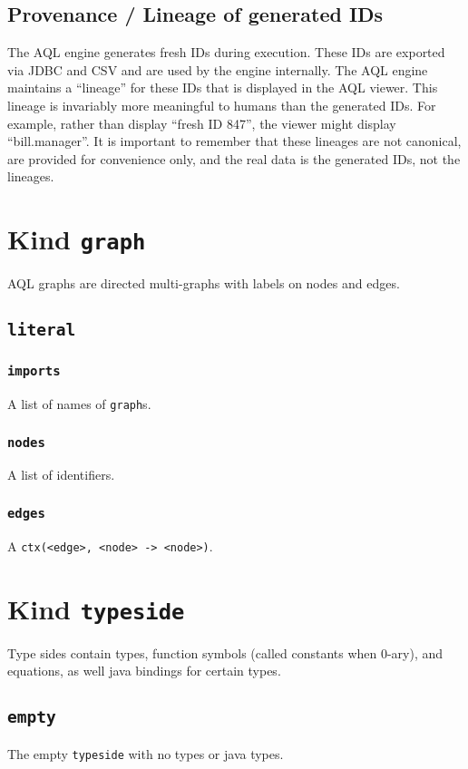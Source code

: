 \documentclass[10pt]{book}
\begin{document}
\section{Provenance / Lineage of generated IDs}

The AQL engine generates fresh IDs during execution.  These IDs are exported via JDBC and CSV and are used by the engine internally.  The AQL engine maintains a ``lineage'' for these IDs that is displayed in the AQL viewer.  This lineage is invariably more meaningful to humans than the generated IDs.  For example, rather than display ``fresh ID 847'', the viewer might display ``bill.manager''.  It is important to remember that these lineages are not canonical, are provided for convenience only, and the real data is the generated IDs, not the lineages.



\chapter{Kind {\tt graph}}
AQL graphs are directed multi-graphs with labels on nodes and edges.

\section{{\tt literal}}
\subsection{{\tt imports}}
A list of names of {\tt graph}s.
\subsection{{\tt nodes}}
A list of identifiers.
\subsection{{\tt edges}}
A {\tt ctx(<edge>, <node> -> <node>)}.

\chapter{Kind {\tt typeside}}
Type sides contain types, function symbols (called constants when 0-ary), and equations, as well java bindings for certain types. 

\section{{\tt empty}}
The empty {\tt typeside} with no types or java types.
\end{document}
